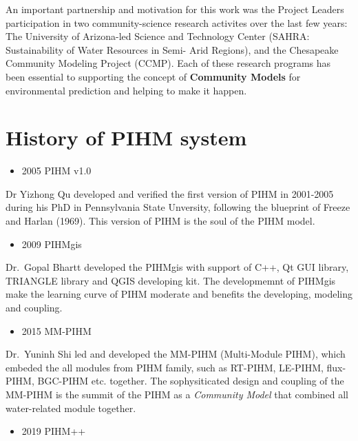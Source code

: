 \documentclass[]{scrbook}
\providecommand{\tightlist}{%
  \setlength{\itemsep}{0pt}\setlength{\parskip}{0pt}}
\begin{document}
An important partnership and motivation for this work was the Project
Leaders participation in two community-science research activites over
the last few years: The University of Arizona-led Science and Technology
Center (SAHRA: Sustainability of Water Resources in Semi- Arid Regions),
and the Chesapeake Community Modeling Project (CCMP). Each of these
research programs has been essential to supporting the concept of
\textbf{Community Models} for environmental prediction and helping to
make it happen.

\section{History of PIHM system}\label{history-of-pihm-system}

\begin{itemize}
\tightlist
\item
  2005 PIHM v1.0
\end{itemize}

Dr Yizhong Qu developed and verified the first version of PIHM in
2001-2005 during his PhD in Pennsylvania State Unversity, following the
blueprint of Freeze and Harlan (1969). This version of PIHM is the soul
of the PIHM model.

\begin{itemize}
\tightlist
\item
  2009 PIHMgis
\end{itemize}

Dr.~Gopal Bhartt developed the PIHMgis with support of C++, Qt GUI
library, TRIANGLE library and QGIS developing kit. The developmemnt of
PIHMgis make the learning curve of PIHM moderate and benefits the
developing, modeling and coupling.

\begin{itemize}
\tightlist
\item
  2015 MM-PIHM
\end{itemize}

Dr.~Yuninh Shi led and developed the MM-PIHM (Multi-Module PIHM), which
embeded the all modules from PIHM family, such as RT-PIHM, LE-PIHM,
flux-PIHM, BGC-PIHM etc. together. The sophysiticated design and
coupling of the MM-PIHM is the summit of the PIHM as a \emph{Community
Model} that combined all water-related module together.

\begin{itemize}
\tightlist
\item
  2019 PIHM++
\end{itemize}
\end{document}
